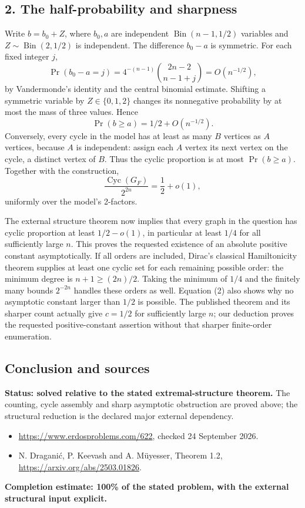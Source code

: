 \subsection*{2. The half-probability and sharpness}
Write $b=b_0+Z$, where $b_0,a$ are independent $\operatorname{Bin}(n-1,1/2)$ variables and $Z\sim\operatorname{Bin}(2,1/2)$ is independent. The difference $b_0-a$ is symmetric. For each fixed integer $j$,
\[
 \Pr(b_0-a=j)=4^{-(n-1)}\binom{2n-2}{n-1+j}=O(n^{-1/2}),
\]
by Vandermonde's identity and the central binomial estimate. Shifting a symmetric variable by $Z\in\{0,1,2\}$ changes its nonnegative probability by at most the mass of three values. Hence
\[
 \Pr(b\ge a)=1/2+O(n^{-1/2}).
\]
Conversely, every cycle in the model has at least as many $B$ vertices as $A$ vertices, because $A$ is independent: assign each $A$ vertex its next vertex on the cycle, a distinct vertex of $B$. Thus the cyclic proportion is at most $\Pr(b\ge a)$. Together with the construction,
\[
 \frac{\operatorname{Cyc}(G_F)}{2^{2n}}=\frac12+o(1),
 \tag{2}
\]
uniformly over the model's 2-factors.

The external structure theorem now implies that every graph in the question has cyclic proportion at least $1/2-o(1)$, in particular at least $1/4$ for all sufficiently large $n$. This proves the requested existence of an absolute positive constant asymptotically. If all orders are included, Dirac's classical Hamiltonicity theorem supplies at least one cyclic set for each remaining possible order: the minimum degree is $n+1\ge(2n)/2$. Taking the minimum of $1/4$ and the finitely many bounds $2^{-2n}$ handles these orders as well.
Equation (2) also shows why no asymptotic constant larger than $1/2$ is possible. The published theorem and its sharper count actually give $c=1/2$ for sufficiently large $n$; our deduction proves the requested positive-constant assertion without that sharper finite-order enumeration.

\subsection*{Conclusion and sources}
\textbf{Status: solved relative to the stated extremal-structure theorem.} The counting, cycle assembly and sharp asymptotic obstruction are proved above; the structural reduction is the declared major external dependency.
\begin{itemize}
\item \url{https://www.erdosproblems.com/622}, checked 24 September 2026.
\item N. Dragani\'c, P. Keevash and A. M\"uyesser, Theorem 1.2, \url{https://arxiv.org/abs/2503.01826}.
\end{itemize}
\noindent\textbf{Completion estimate: 100\% of the stated problem, with the external structural input explicit.}
